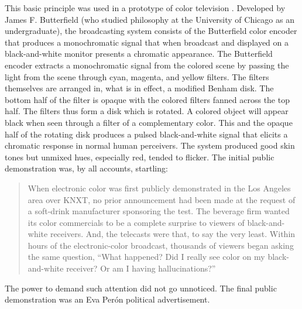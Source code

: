 This basic principle was used in a prototype of color television \citep[]{Butterfield:1968uq,Butterfield:1970kx}. Developed by James F. Butterfield (who studied philosophy at the University of Chicago as an undergraduate), the broadcasting system consists of the Butterfield color encoder that produces a monochromatic signal that when broadcast and displayed on a black-and-white monitor presents a chromatic appearance. The Butterfield encoder extracts a monochromatic signal from the colored scene by passing the light from the scene through cyan, magenta, and yellow filters. The filters themselves are arranged in, what is in effect, a modified Benham disk. The bottom half of the filter is opaque with the colored filters fanned across the top half. The filters thus form a disk which is rotated. A colored object will appear black when seen through a filter of a complementary color. This and the opaque half of the rotating disk produces a pulsed black-and-white signal that elicits a chromatic response in normal human perceivers. The system produced good skin tones but unmixed hues, especially red, tended to flicker. The initial public demonstration was, by all accounts, startling:
\begin{quote}
    When electronic color was first publicly demonstrated in the Los Angeles area over KNXT, no prior announcement had been made at the request of a soft-drink manufacturer sponsoring the test. The beverage firm wanted its color commercials to be a complete surprise to viewers of black-and-white receivers. And, the telecasts were that, to say the very least. Within hours of the electronic-color broadcast, thousands of viewers began asking the same question, ``What happened? Did I really see color on my black-and-white receiver? Or am I having hallucinations?'' \citep[]{Griffin:1968fk}
\end{quote}
The power to demand such attention did not go unnoticed. The final public demonstration was an Eva Per\'{o}n political advertisement.


